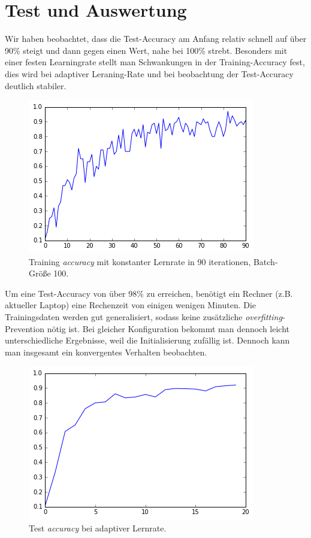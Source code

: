 \documentclass[10pt,journal,compsoc]{IEEEtran}
\begin{document}
\section{Test und Auswertung}
Wir haben beobachtet, dass die Test-Accuracy am Anfang relativ schnell auf über 90\% steigt und dann gegen einen Wert, nahe bei 100\% strebt. Besonders mit einer festen Learningrate stellt man Schwankungen in der Training-Accuracy fest, dies wird bei adaptiver Leraning-Rate und bei beobachtung der Test-Accuracy deutlich stabiler.
\begin{figure}[!h]
\centering
\includegraphics[scale=0.5]{accuracy_90_iterations_fixed_learning_rate}
\caption{Training \emph{accuracy} mit konstanter Lernrate in 90 iterationen, Batch-Größe 100.}
\end{figure}

Um eine Test-Accuracy von über 98\% zu erreichen, benötigt ein Rechner (z.B. aktueller Laptop) eine Rechenzeit von einigen wenigen Minuten. Die Trainingsdaten werden gut generalisiert, sodass keine zusätzliche \emph{overfitting}-Prevention nötig ist. Bei gleicher Konfiguration bekommt man dennoch leicht unterschiedliche Ergebnisse, weil die Initialisierung zufällig ist. Dennoch kann man insgesamt ein konvergentes Verhalten beobachten.

\begin{figure}[!h]
\centering
\includegraphics[scale=0.5]{test_accuracy_adapt_rate}
\caption{Test \emph{accuracy} bei adaptiver Lernrate.}
\end{figure}
\appendices
\end{document}
